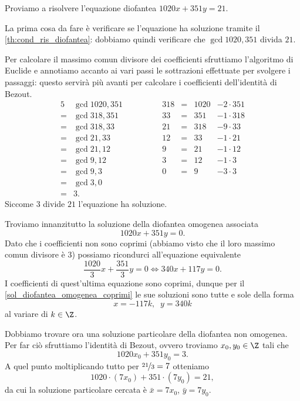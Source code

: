 \begin{example}
    Proviamo a risolvere l'equazione diofantea $1020x + 351y = 21$.

    La prima cosa da fare è verificare se l'equazione ha soluzione tramite il \autoref{th:cond_ris_diofantea}: dobbiamo quindi verificare che $\gcd{1020, 351}$ divida $21$.

    Per calcolare il massimo comun divisore dei coefficienti sfruttiamo l'algoritmo di Euclide e annotiamo accanto ai vari passi le sottrazioni effettuate per svolgere i passaggi: questo servirà più avanti per calcolare i coefficienti dell'identità di Bezout.
    \begin{alignat*}{5}
            &\gcd{1020, 351}  \qquad\qquad &318 &= {}&1020 {}&- \boxed{2} \cdot 351\\
        = {}&\gcd{318, 351}   \qquad\qquad &33  &= {}&351  {}&- \boxed{1} \cdot 318\\
        = {}&\gcd{318, 33}    \qquad\qquad &21  &= {}&318  {}&- \boxed{9} \cdot 33\\
        = {}&\gcd{21, 33}     \qquad\qquad &12  &= {}&33   {}&- \boxed{1} \cdot 21\\
        = {}&\gcd{21, 12}     \qquad\qquad &9   &= {}&21   {}&- \boxed{1} \cdot 12\\
        = {}&\gcd{9, 12}      \qquad\qquad &3   &= {}&12   {}&- \boxed{1} \cdot 3\\
        = {}&\gcd{9, 3}       \qquad\qquad &0   &= {}&9    {}&- \boxed{3} \cdot 3\\
        = {}&\gcd{3, 0}       \\
        = {}&3.
    \end{alignat*}
    Siccome $3$ divide $21$ l'equazione ha soluzione.

    Troviamo innanzitutto la soluzione della diofantea omogenea associata \[
        1020x + 351y = 0.    
    \] Dato che i coefficienti non sono coprimi (abbiamo visto che il loro massimo comun divisore è $3$) possiamo ricondurci all'equazione equivalente \[
        \frac{1020}{3}x + \frac{351}{3}y = 0 \iff 340x + 117y = 0.    
    \] I coefficienti di quest'ultima equazione sono coprimi, dunque per il \autoref{sol_diofantea_omogenea_coprimi} le sue soluzioni sono tutte e sole della forma \[
        x = -117k, \;\; y = 340k    
    \] al variare di $k \in \Z$.

    Dobbiamo trovare ora una soluzione particolare della diofantea non omogenea. Per far ciò sfruttiamo l'identità di Bezout, ovvero troviamo $x_0, y_0 \in \Z$ tali che \[
        1020x_0 + 351y_0 = 3.    
    \] A quel punto moltiplicando tutto per $\nicefrac{21}{3} = 7$ otteniamo \[
        1020\cdot(7x_0) + 351\cdot(7y_0) = 21,    
    \] da cui la soluzione particolare cercata è $\bar x = 7x_0$, $\bar y = 7y_0$.


\end{example}
